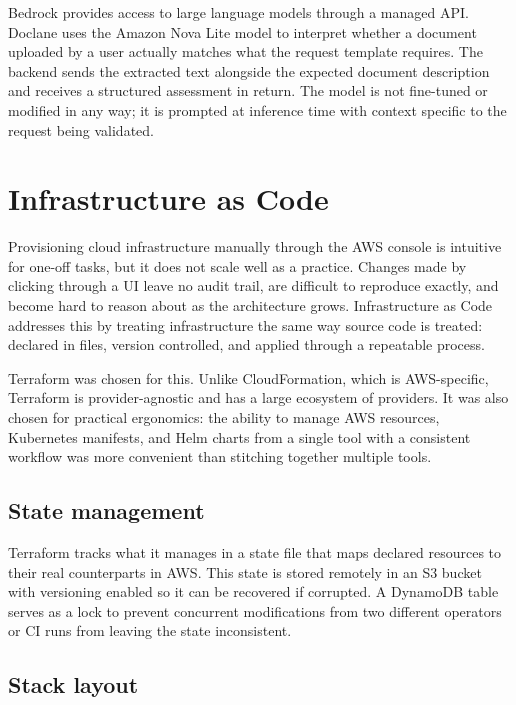 \par Bedrock provides access to large language models through a managed API. Doclane uses the Amazon Nova Lite model to interpret whether a document uploaded by a user actually matches what the request template requires. The backend sends the extracted text alongside the expected document description and receives a structured assessment in return. The model is not fine-tuned or modified in any way; it is prompted at inference time with context specific to the request being validated.

\section{Infrastructure as Code}

\par Provisioning cloud infrastructure manually through the AWS console is intuitive for one-off tasks, but it does not scale well as a practice. Changes made by clicking through a UI leave no audit trail, are difficult to reproduce exactly, and become hard to reason about as the architecture grows. Infrastructure as Code addresses this by treating infrastructure the same way source code is treated: declared in files, version controlled, and applied through a repeatable process.

\par Terraform was chosen for this. Unlike CloudFormation, which is AWS-specific, Terraform is provider-agnostic and has a large ecosystem of providers. It was also chosen for practical ergonomics: the ability to manage AWS resources, Kubernetes manifests, and Helm charts from a single tool with a consistent workflow was more convenient than stitching together multiple tools.

\subsection{State management}

\par Terraform tracks what it manages in a state file that maps declared resources to their real counterparts in AWS. This state is stored remotely in an S3 bucket with versioning enabled so it can be recovered if corrupted. A DynamoDB table serves as a lock to prevent concurrent modifications from two different operators or CI runs from leaving the state inconsistent.

\subsection{Stack layout}

